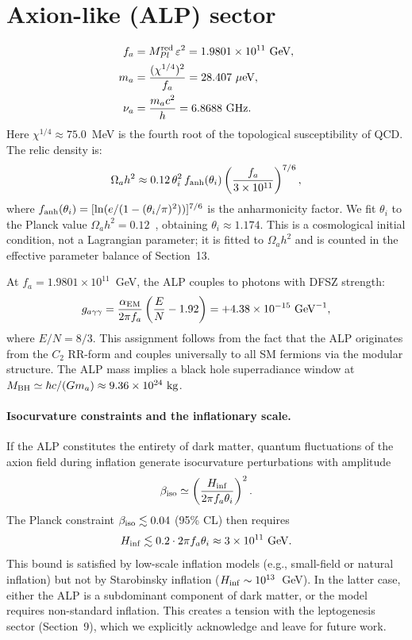 \documentclass[12pt,a4paper]{article}
\numberwithin{equation}{section}
\begin{document}
\section{Axion-like (ALP) sector}
\begin{align}
f_a &= M_{Pl}^{\rm red}\,\varepsilon^2 = 1.9801\times10^{11}~\text{GeV}, \\
m_a &= \frac{(\chi^{1/4})^2}{f_a} = 28.407~\mu\text{eV}, \\
\nu_a &= \frac{m_a c^2}{h} = 6.8688~\text{GHz}.
\end{align}
Here \(\chi^{1/4} \approx 75.0\)~MeV is the fourth root of the topological susceptibility of QCD. The relic density is:
\begin{equation}
\Omega_a h^2 \approx 0.12\,\theta_i^2\, f_{\rm anh}(\theta_i)\left(\frac{f_a}{3\times10^{11}}\right)^{7/6},
\end{equation}
where \(f_{\rm anh}(\theta_i) = [\ln(e/(1-(\theta_i/\pi)^2))]^{7/6}\) is the anharmonicity factor. We fit \(\theta_i\) to the Planck value \(\Omega_a h^2 = 0.12\)~\cite{Planck2018}, obtaining \(\theta_i \approx 1.174\). This is a cosmological initial condition, not a Lagrangian parameter; it is fitted to \(\Omega_a h^2\) and is counted in the effective parameter balance of Section~13.

At \(f_a = 1.9801\times10^{11}\)~GeV, the ALP couples to photons with DFSZ strength:
\begin{equation}
g_{a\gamma\gamma} = \frac{\alpha_{\rm EM}}{2\pi f_a} \left(\frac{E}{N} - 1.92\right) = +4.38 \times 10^{-15}~\text{GeV}^{-1},
\end{equation}
where \(E/N = 8/3\). This assignment follows from the fact that the ALP originates from the \(C_2\) RR-form and couples universally to all SM fermions via the modular structure. The ALP mass implies a black hole superradiance window at \(M_{\rm BH} \simeq \hbar c / (G m_a) \approx 9.36 \times 10^{24}~{\rm kg}\).

\paragraph{Isocurvature constraints and the inflationary scale.}
If the ALP constitutes the entirety of dark matter, quantum fluctuations of the axion field during inflation generate isocurvature perturbations with amplitude
\begin{equation}
\beta_{\rm iso} \simeq \left(\frac{H_{\rm inf}}{2\pi f_a \theta_i}\right)^2.
\end{equation}
The Planck constraint \(\beta_{\rm iso} \lesssim 0.04\) (95\% CL) then requires
\begin{equation}
H_{\rm inf} \lesssim 0.2 \cdot 2\pi f_a \theta_i \approx 3 \times 10^{11}~\text{GeV}.
\end{equation}
This bound is satisfied by low-scale inflation models (e.g., small-field or natural inflation) but not by Starobinsky inflation (\(H_{\rm inf} \sim 10^{13}\)~GeV). In the latter case, either the ALP is a subdominant component of dark matter, or the model requires non-standard inflation. This creates a tension with the leptogenesis sector (Section~9), which we explicitly acknowledge and leave for future work.
\end{document}
